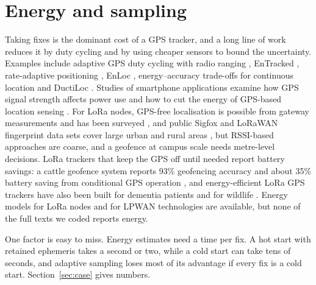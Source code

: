 \documentclass[12pt]{article}
\let\cite\citep
\begin{document}
\section{Energy and sampling}\label{sec:energy}
Taking fixes is the dominant cost of a GPS tracker, and a long line of work reduces it by duty cycling and by using cheaper sensors to bound the uncertainty. Examples include adaptive GPS duty cycling with radio ranging \cite{jurdak2010adaptive}, EnTracked \cite{kjaergaard2009entracked}, rate-adaptive positioning \cite{paek2010raps}, EnLoc \cite{constandache2009enloc}, energy--accuracy trade-offs for continuous location \cite{lin2010aloc} and DuctiLoc \cite{katsikouli2023ductiloc}. Studies of smartphone applications examine how GPS signal strength affects power use and how to cut the energy of GPS-based location sensing \cite{tawalbeh2016greener,oshin2012improving}. For LoRa nodes, GPS-free localisation is possible from gateway measurements \cite{fargas2017gpsfree} and has been surveyed \cite{gu2018lora,tahaei2025overview,janssen2023survey,moradbeikie2021gnss}, and public Sigfox and LoRaWAN fingerprint data sets cover large urban and rural areas \cite{aernouts2018sigfox}, but RSSI-based approaches are coarse, and a geofence at campus scale needs metre-level decisions. LoRa trackers that keep the GPS off until needed report battery savings: a cattle geofence system reports 93\% geofencing accuracy and about 35\% battery saving from conditional GPS operation \cite{j2026fencing}, and energy-efficient LoRa GPS trackers have also been built for dementia patients and for wildlife \cite{hadwen2017dementia,lopezescobar2025wildlife}. Energy models for LoRa nodes \cite{bouguera2018energy,casals2017energy} and for LPWAN technologies \cite{singh2020energy} are available, but none of the full texts we coded reports energy.

One factor is easy to miss. Energy estimates need a time per fix. A hot start with retained ephemeris takes a second or two, while a cold start can take tens of seconds, and adaptive sampling loses most of its advantage if every fix is a cold start. Section~\ref{sec:case} gives numbers.

\end{document}
